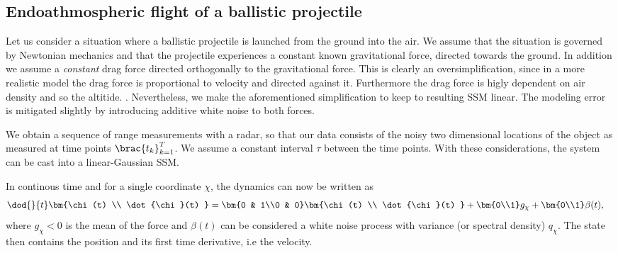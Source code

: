 

\subsection{Endoathmospheric flight of a ballistic projectile}\label{sec:ballistic}
Let us consider a situation where a ballistic projectile is launched
from the ground into the air. We assume that the situation is governed by Newtonian
mechanics and that the projectile experiences a constant known gravitational
force, directed towards the ground. In addition we assume a \emph{constant}
drag force directed orthogonally to the gravitational force. This is clearly
an oversimplification, since in a more realistic model the drag
force is proportional to velocity and directed against it. Furthermore
the drag force is higly dependent on air density and so the altitide. \parencite{ristic2004beyond}.
Nevertheless, we make the aforementioned simplification to keep to resulting
SSM linear. The modeling error is mitigated slightly by introducing
additive white noise to both forces.

We obtain a sequence of range measurements with a radar,
so that our data consists of the noisy two dimensional locations 
of the object as measured at time points $\brac{t_k}_{k=1}^T$.
We assume a constant interval $\tau$ between the time points. With these 
considerations, the system can be cast into a linear-Gaussian SSM. 

In continous time and for a single coordinate $\chi$, 
the dynamics can now be written as
\begin{align}
	\dod{}{t}\bm{\chi(t) \\ \dot{\chi}(t) } &= 
	\bm{0 & 1\\0 & 0}\bm{\chi(t) \\ \dot{\chi}(t) } + \bm{0\\1}g_\chi + \bm{0\\1}\beta(t),
	\label{eq:ct_linear}
\end{align}
where $g_\chi<0$ is the mean of the force and $\beta(t)$ can be considered
a white noise process with variance (or spectral density) $q_\chi$. 
The state then contains the position and its first time derivative, i.e the velocity. 


